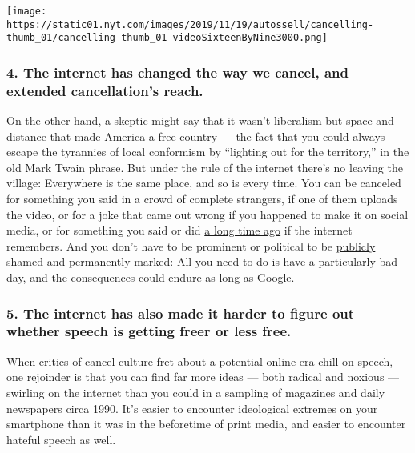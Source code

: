 \texttt{[image: https://static01.nyt.com/images/2019/11/19/autossell/cancelling-thumb\_01/cancelling-thumb\_01-videoSixteenByNine3000.png]}

\hypertarget{4-the-internet-has-changed-the-way-we-cancel-and-extended-cancellations-reach}{%
\subsubsection{4. The internet has changed the way we cancel, and
extended cancellation's
reach.}\label{4-the-internet-has-changed-the-way-we-cancel-and-extended-cancellations-reach}}

On the other hand, a skeptic might say that it wasn't liberalism but
space and distance that made America a free country --- the fact that
you could always escape the tyrannies of local conformism by ``lighting
out for the territory,'' in the old Mark Twain phrase. But under the
rule of the internet there's no leaving the village: Everywhere is the
same place, and so is every time. You can be canceled for something you
said in a crowd of complete strangers, if one of them uploads the video,
or for a joke that came out wrong if you happened to make it on social
media, or for something you said or did
\href{https://www.nytimes.com/reuters/2020/07/02/business/02reuters-boeing-resignation.html}{a
long time ago} if the internet remembers. And you don't have to be
prominent or political to be
\href{https://www.penguinrandomhouse.com/books/306321/so-youve-been-publicly-shamed-by-jon-ronson/}{publicly
shamed} and
\href{https://www.nytimes.com/2018/10/23/nyregion/man-found-dead-in-car-new-york.html}{permanently
marked}: All you need to do is have a particularly bad day, and the
consequences could endure as long as Google.

\hypertarget{5-the-internet-has-also-made-it-harder-to-figure-out-whether-speech-is-getting-freer-or-less-free}{%
\subsubsection{5. The internet has also made it harder to figure out
whether speech is getting freer or less
free.}\label{5-the-internet-has-also-made-it-harder-to-figure-out-whether-speech-is-getting-freer-or-less-free}}

When critics of cancel culture fret about a potential online-era chill
on speech, one rejoinder is that you can find far more ideas --- both
radical and noxious --- swirling on the internet than you could in a
sampling of magazines and daily newspapers circa 1990. It's easier to
encounter ideological extremes on your smartphone than it was in the
beforetime of print media, and easier to encounter hateful speech as
well.

